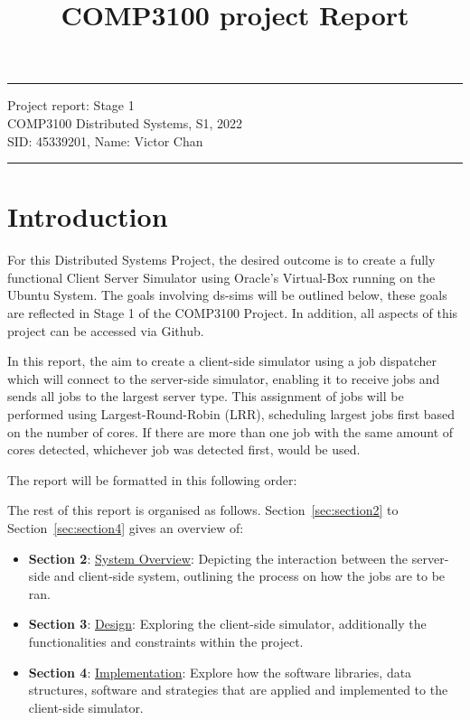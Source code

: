 \documentclass[a4paper]{article} %
\begin{document}

\title{COMP3100 project Report} %
\fancyhead[C]{}
\hrule \medskip %
\begin{minipage}{1\textwidth} %
\centering 
\large %
Project report: Stage 1\\ %
COMP3100 Distributed Systems, S1, 2022\\
\normalsize %
SID: 45339201, Name: Victor Chan
\end{minipage}
\medskip\hrule %
\bigskip

\section{Introduction}
For this Distributed Systems Project, the desired outcome is to create a fully functional Client Server Simulator using Oracle's Virtual-Box \cite{VirtualBox} running on the Ubuntu \cite{Ubuntu} System. The goals involving ds-sims will be outlined below, these goals are reflected in Stage 1 of the COMP3100 Project. In addition, all aspects of this project can be accessed via Github\cite{github}.
\bigskip

In this report, the aim to create a client-side simulator using a job dispatcher which will connect to the server-side simulator, enabling it to receive jobs and sends all jobs to the largest server type. This assignment of jobs will be performed using Largest-Round-Robin (LRR), scheduling largest jobs first based on the number of cores. If there are more than one job with the same amount of cores detected, whichever job was detected first, would be used.
\bigskip

The report will be formatted in this following order:
\bigskip

The rest of this report is organised as follows. Section~\ref{sec:section2} to Section~\ref{sec:section4} gives an overview of:
\begin{itemize}
  \item \textbf{Section 2}: \underline{System Overview}: Depicting the interaction between the server-side and client-side system, outlining the process on how the jobs are to be ran.
  \item \textbf{Section 3}: \underline{Design}: Exploring the client-side simulator, additionally the functionalities and constraints within the project.
  \item \textbf{Section 4}: \underline{Implementation}: Explore how the software libraries, data structures, software and strategies that are applied and implemented to the client-side simulator.
\end{itemize}
\end{document}
